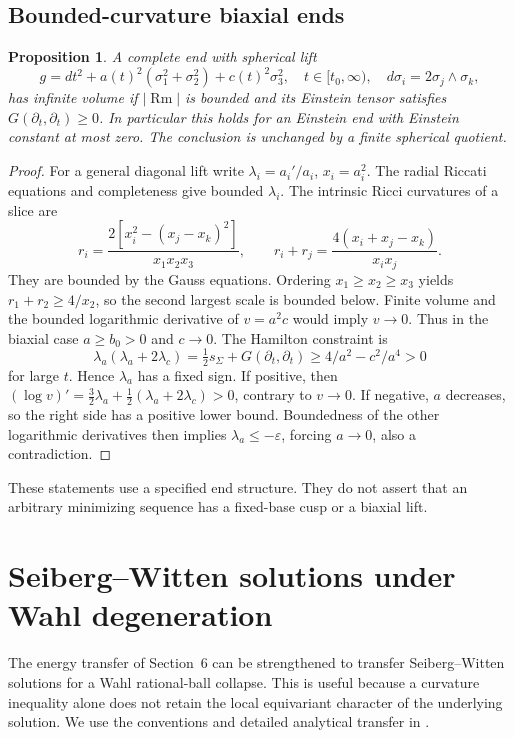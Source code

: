 \documentclass[11pt,a4paper]{article}
\newtheorem{proposition}[theorem]{Proposition}
\theoremstyle{definition}\newtheorem{definition}[theorem]{Definition}
\theoremstyle{remark}\newtheorem{remark}[theorem]{Remark}
\newcommand{\Rm}{\operatorname{Rm}}
\newcommand{\eps}{\varepsilon}
\begin{document}
\subsection{Bounded-curvature biaxial ends}
\begin{proposition}\label{prop:biaxial}
A complete end with spherical lift
\[
 g=dt^2+a(t)^2(\sigma_1^2+\sigma_2^2)+c(t)^2\sigma_3^2,
 \quad t\in[t_0,\infty),\quad d\sigma_i=2\sigma_j\wedge\sigma_k,
\]
has infinite volume if $|\Rm|$ is bounded and its Einstein tensor satisfies $G(\partial_t,\partial_t)\ge0$. In particular this holds for an Einstein end with Einstein constant at most zero. The conclusion is unchanged by a finite spherical quotient.
\end{proposition}
\begin{proof}
For a general diagonal lift write $\lambda_i=a_i'/a_i$, $x_i=a_i^2$. The radial Riccati equations and completeness give bounded $\lambda_i$. The intrinsic Ricci curvatures of a slice are
\[
 r_i=\frac{2[x_i^2-(x_j-x_k)^2]}{x_1x_2x_3},\qquad
 r_i+r_j=\frac{4(x_i+x_j-x_k)}{x_ix_j}.
\]
They are bounded by the Gauss equations. Ordering $x_1\ge x_2\ge x_3$ yields $r_1+r_2\ge4/x_2$, so the second largest scale is bounded below. Finite volume and the bounded logarithmic derivative of $v=a^2c$ would imply $v\to0$. Thus in the biaxial case $a\ge b_0>0$ and $c\to0$.
The Hamilton constraint is
\[
 \lambda_a(\lambda_a+2\lambda_c)
 =\tfrac12s_\Sigma+G(\partial_t,\partial_t)
 \ge4/a^2-c^2/a^4>0
\]
for large $t$. Hence $\lambda_a$ has a fixed sign. If positive, then
$(\log v)'=\tfrac32\lambda_a+\tfrac12(\lambda_a+2\lambda_c)>0$, contrary to $v\to0$. If negative, $a$ decreases, so the right side has a positive lower bound. Boundedness of the other logarithmic derivatives then implies $\lambda_a\le-\eps$, forcing $a\to0$, also a contradiction.
\end{proof}
These statements use a specified end structure. They do not assert that an arbitrary minimizing sequence has a fixed-base cusp or a biaxial lift.

\section{Seiberg--Witten solutions under Wahl degeneration}
The energy transfer of Section~6 can be strengthened to transfer Seiberg--Witten solutions for a Wahl rational-ball collapse. This is useful because a curvature inequality alone does not retain the local equivariant character of the underlying solution. We use the conventions and detailed analytical transfer in \cite{RepoWahl}.
\end{document}
